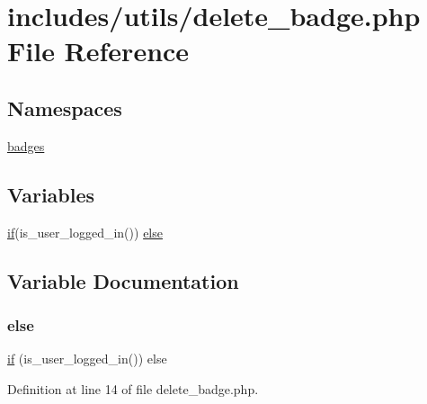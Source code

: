 \hypertarget{delete__badge_8php}{}\section{includes/utils/delete\+\_\+badge.php File Reference}
\label{delete__badge_8php}
\subsection*{Namespaces}
\begin{DoxyCompactItemize}
\item 
 \hyperlink{namespacebadges}{badges}
\end{DoxyCompactItemize}
\subsection*{Variables}
\begin{DoxyCompactItemize}
\item 
\hyperlink{comments__template_8php_aa69d65d13534429621eba50597158c85}{if}(is\+\_\+user\+\_\+logged\+\_\+in()) \hyperlink{delete__badge_8php_a8d42525897d9dd0c69ce4bed62cf3985}{else}
\end{DoxyCompactItemize}


\subsection{Variable Documentation}
\mbox{\label{delete__badge_8php_a8d42525897d9dd0c69ce4bed62cf3985}} 
\subsubsection{\texorpdfstring{else}{else}}
{\footnotesize\ttfamily \hyperlink{comments__template_8php_aa69d65d13534429621eba50597158c85}{if} (is\+\_\+user\+\_\+logged\+\_\+in()) else}



Definition at line 14 of file delete\+\_\+badge.\+php.

